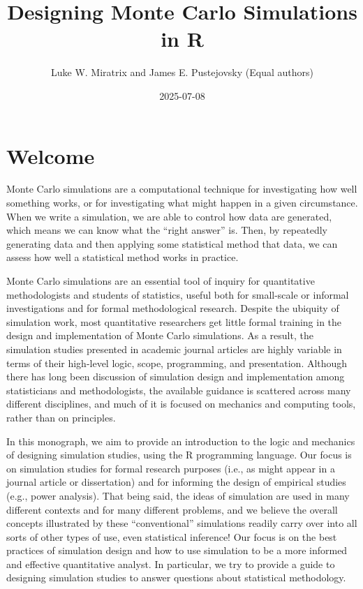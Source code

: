 \documentclass[
]{book}
\title{Designing Monte Carlo Simulations in R}
\author{Luke W. Miratrix and James E. Pustejovsky
(Equal authors)}
\date{2025-07-08}
\begin{document}
\maketitle

{
\setcounter{tocdepth}{1}
\tableofcontents
}
\chapter*{Welcome}\label{welcome}

Monte Carlo simulations are a computational technique for investigating how well something works, or for investigating what might happen in a given circumstance.
When we write a simulation, we are able to control how data are generated, which means we can know what the ``right answer'' is.
Then, by repeatedly generating data and then applying some statistical method that data, we can assess how well a statistical method works in practice.

Monte Carlo simulations are an essential tool of inquiry for quantitative methodologists and students of statistics, useful both for small-scale or informal investigations and for formal methodological research.
Despite the ubiquity of simulation work, most quantitative researchers get little formal training in the design and implementation of Monte Carlo simulations. As a result, the simulation studies presented in academic journal articles are highly variable in terms of their high-level logic, scope, programming, and presentation.
Although there has long been discussion of simulation design and implementation among statisticians and methodologists, the available guidance is scattered across many different disciplines, and much of it is focused on mechanics and computing tools, rather than on principles.

In this monograph, we aim to provide an introduction to the logic and mechanics of designing simulation studies, using the R programming language.
Our focus is on simulation studies for formal research purposes (i.e., as might appear in a journal article or dissertation) and for informing the design of empirical studies (e.g., power analysis).
That being said, the ideas of simulation are used in many different contexts and for many different problems, and we believe the overall concepts illustrated by these ``conventional'' simulations readily carry over into all sorts of other types of use, even statistical inference!
Our focus is on the best practices of simulation design and how to use simulation to be a more informed and effective quantitative analyst.
In particular, we try to provide a guide to designing simulation studies to answer questions about statistical methodology.
\end{document}
